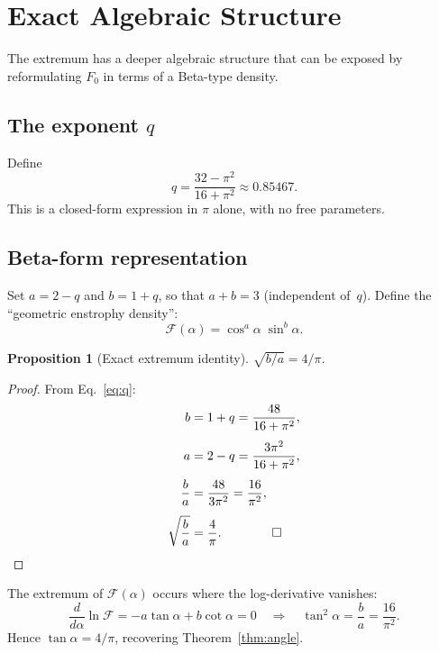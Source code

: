 \documentclass[12pt,a4paper]{article}
\newtheorem{proposition}{Proposition}
\begin{document}
\section{Exact Algebraic Structure}
\label{sec:algebraic}

The extremum has a deeper algebraic structure that can be exposed by reformulating $F_0$ in terms of a Beta-type density.

\subsection{The exponent $q$}

Define
\begin{equation}
\label{eq:q}
q = \frac{32 - \pi^2}{16 + \pi^2} \approx 0.85467.
\end{equation}
This is a closed-form expression in $\pi$ alone, with no free parameters.

\subsection{Beta-form representation}

Set $a = 2 - q$ and $b = 1 + q$, so that $a + b = 3$ (independent of~$q$).
Define the ``geometric enstrophy density'':
\begin{equation}
\label{eq:Fbeta}
\mathcal{F}(\alpha) = \cos^a\!\alpha \;\sin^b\!\alpha.
\end{equation}

\begin{proposition}[Exact extremum identity]
\label{prop:sqrtba}
$\sqrt{b/a} = 4/\pi$.
\end{proposition}

\begin{proof}
From Eq.~\eqref{eq:q}:
\begin{align}
b &= 1 + q = \frac{48}{16 + \pi^2}, \\[4pt]
a &= 2 - q = \frac{3\pi^2}{16 + \pi^2}, \\[4pt]
\frac{b}{a} &= \frac{48}{3\pi^2} = \frac{16}{\pi^2}, \\[4pt]
\sqrt{\frac{b}{a}} &= \frac{4}{\pi}. \qquad\qed
\end{align}
\end{proof}

\noindent The extremum of $\mathcal{F}(\alpha)$ occurs where the log-derivative vanishes:
\begin{equation}
\frac{d}{d\alpha}\ln\mathcal{F} = -a\tan\alpha + b\cot\alpha = 0 \quad\Longrightarrow\quad \tan^2\alpha = \frac{b}{a} = \frac{16}{\pi^2}.
\end{equation}
Hence $\tan\alpha = 4/\pi$, recovering Theorem~\ref{thm:angle}.
\end{document}
